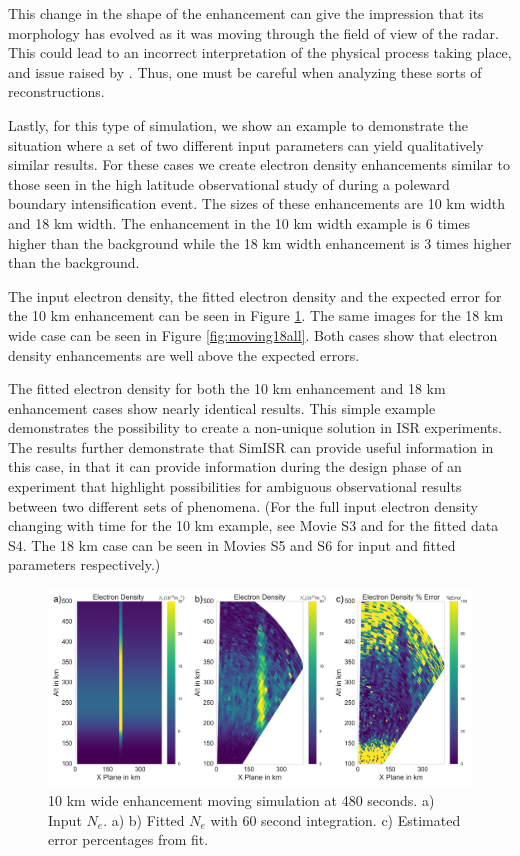 \documentclass[draft,ras]{agutex}
\begin{document}
\begin{article}
This change in the shape of the enhancement can give the impression that its morphology has evolved as it was moving through the field of view of the radar. This could lead to an incorrect interpretation of the physical process taking place, and issue raised by \citet{Dahlgren:2012dq}.   Thus, one must be careful when analyzing these sorts of reconstructions.

Lastly, for this type of simulation, we show an example to demonstrate the situation where a set of two different input parameters can yield qualitatively similar results. For these cases we create electron density enhancements similar to those seen in the high latitude observational study of \citet{Semeter:2005fo} during a poleward boundary intensification event. The sizes of these enhancements are 10 km width and 18 km width. The enhancement in the 10 km width example is 6 times higher than the background while the 18 km width enhancement is 3 times higher than the background.

The input electron density, the fitted electron density and the expected error for the 10 km enhancement can be seen in Figure \ref{fig:moving10all}. The same images for the 18 km wide case can be seen in Figure \ref{fig:moving18all}. Both cases show that electron density enhancements are well above the expected errors.

The fitted electron density for both the 10 km enhancement and 18 km enhancement cases show nearly identical results. This simple example demonstrates the possibility to create a non-unique solution in ISR experiments. The results further demonstrate that SimISR can provide useful information in this case, in that it can provide information during the design phase of an experiment that highlight possibilities for ambiguous observational results between two different sets of phenomena. (For the full input electron density changing with time for the 10 km example, see Movie S3 and for the fitted data S4. The 18 km case can be seen in Movies S5 and S6 for input and fitted parameters respectively.)

\begin{figure}[!t]
\centering
\includegraphics[width=6in]{moving10kminouterr}
\caption{10 km wide enhancement moving simulation at 480 seconds. a) Input $N_e$. a)  b) Fitted $N_e$ with 60 second integration. c) Estimated error percentages from fit.}
\label{fig:moving10all}
\end{figure}


\end{article}
\end{document}
